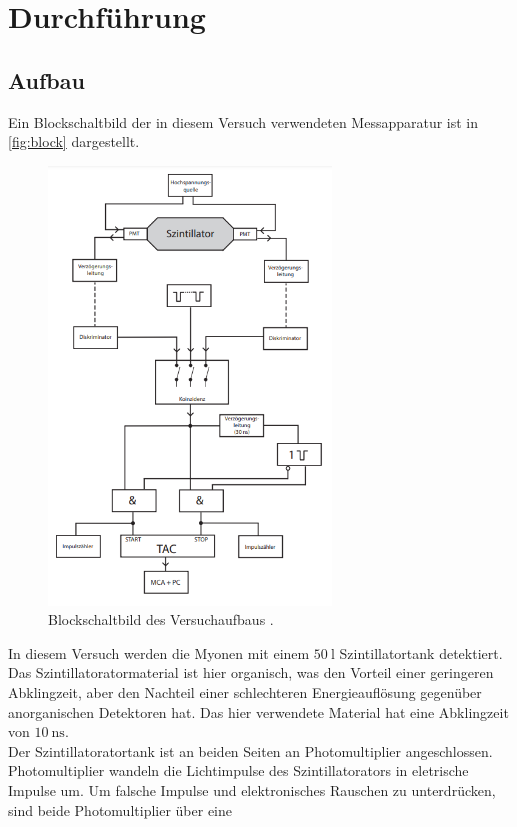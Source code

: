 \section{Durchführung}
\subsection{Aufbau}
Ein Blockschaltbild der in diesem Versuch verwendeten Messapparatur ist in \autoref{fig:block}
dargestellt.
\begin{figure}
    \centering
    \includegraphics[width=0.67\textwidth]{block.png}
    \caption{Blockschaltbild des Versuchaufbaus \cite{anleitung}.}
    \label{fig:block}
\end{figure}
In diesem Versuch werden die Myonen mit einem $\SI{50}{\litre}$ Szintillatortank detektiert. Das Szintillatoratormaterial
ist hier organisch, was den Vorteil einer geringeren Abklingzeit, aber den Nachteil einer schlechteren Energieauflösung
gegenüber anorganischen Detektoren hat. Das hier verwendete Material hat eine Abklingzeit von $\SI{10}{\nano\second}$.\\
Der Szintillatoratortank ist an beiden Seiten an Photomultiplier angeschlossen. Photomultiplier wandeln die Lichtimpulse
des Szintillatorators in eletrische Impulse um.
Um falsche Impulse und elektronisches Rauschen zu unterdrücken, sind beide Photomultiplier über eine
